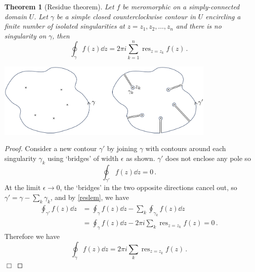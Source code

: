 \documentclass{article}
\theoremstyle{plain}\theoremheaderfont{\normalfont\itshape}\theorembodyfont{\rmfamily}\theoremseparator{.}\newtheorem*{rem}{Remark}\newtheorem*{ex}{Example}\newtheorem*{proof}{Proof}\newtheorem*{altp}{Alternative proof}
\theoremstyle{plain}\theoremheaderfont{\normalfont\bfseries}\theorembodyfont{\rmfamily}\theoremseparator{.}\newtheorem{thm}{Theorem}[section]\newtheorem{lem}[thm]{Lemma}\newtheorem{prop}[thm]{Proposition}\newtheorem*{cor}{Corollary}\newtheorem{defn}[thm]{Definition}\newtheorem{clm}[thm]{Claim}\newtheorem{clminproof}{Claim}
\theoremstyle{break}\theoremheaderfont{\normalfont\itshape}\theorembodyfont{\rmfamily}\theoremseparator{.\medskip}\newtheorem*{proofskip}{Proof}\newtheorem*{exs}{Examples}\newtheorem*{rems}{Remarks}
\theoremstyle{break}\theoremheaderfont{\normalfont\bfseries}\theorembodyfont{\rmfamily}\theoremseparator{.\medskip}\newtheorem{lemskip}[thm]{Lemma}\newtheorem{defnskip}[thm]{Definition}\newtheorem{propskip}[thm]{Proposition}\newtheorem{thmskip}[thm]{Theorem}
\numberwithin{equation}{section}
\newcommand{\qed}{\hfill\ensuremath{\Box}}
\DeclareMathOperator*{\res}{res}
\begin{document}
	\begin{thm}[Residue theorem]\label{resthm}
		Let \(f\) be meromorphic on a simply-connected domain \(U\). Let \(\gamma\) be a simple closed counterclockwise contour in \(U\) encircling a finite number of isolated singularities at \(z=z_1,z_2,\dots,z_n\) and there is no singularity on \(\gamma\), then
		\[\oint_\gamma f(z)\dd{z}=2\pi i\sum_{k=1}^{n}\res_{z=z_k}f(z)\,.\]
	\end{thm}
	\begin{center}
		\includegraphics[width=0.8\textwidth]{Residue.png}
	\end{center}

	\begin{proof}
		Consider a new contour \(\gamma'\) by joining \(\gamma\) with contours around each singularity \(\gamma_k\) using `bridges' of width \(\epsilon\) as shown. \(\gamma'\) does not enclose any pole so
		\[\oint_{\gamma'}f(z)\dd{z}=0\,.\]
		At the limit \(\epsilon\to 0\), the `bridges' in the two opposite directions cancel out, so \(\gamma'=\gamma-\sum_k\gamma_k\), and by \cref{reslem}, we have
		\begin{align*}
			\oint_{\gamma'}f(z)\dd{z}&=\oint_\gamma f(z)\dd{z}-\sum_k\oint_{\gamma_k}f(z)\dd{z}\\
			&=\oint_\gamma f(z)\dd{z}-2\pi i\sum_k\res_{z=z_k}f(z)=0\,.
		\end{align*}
		Therefore we have
		\[\oint_\gamma f(z)\dd{z}=2\pi i\sum_k\res_{z=z_k}f(z)\,.\]\qed
	\end{proof}
\end{document}
